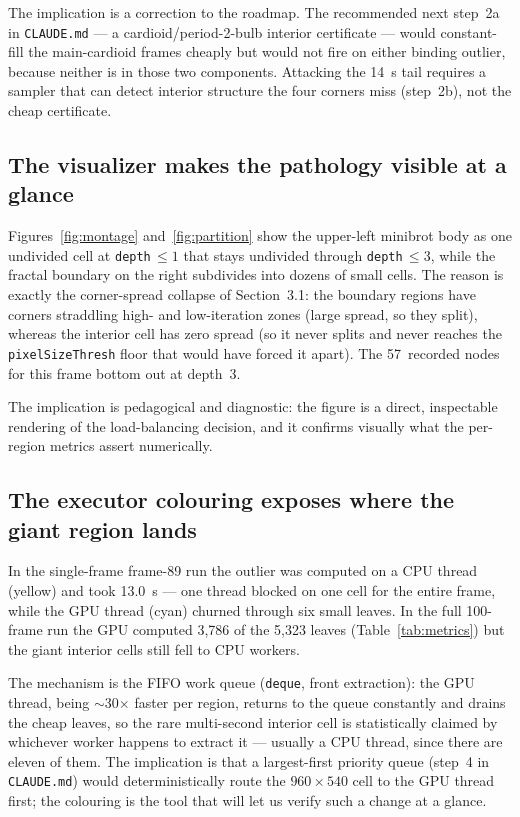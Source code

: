 \documentclass[
	english,
	letterpaper, oneside
]{article}
\begin{document}
The implication is a correction to the roadmap. The recommended next step~2a in
\texttt{CLAUDE.md} --- a cardioid/period-2-bulb interior certificate --- would
constant-fill the main-cardioid frames cheaply but would not fire on
either binding outlier, because neither is in those two components. Attacking
the 14~s tail requires a sampler that can detect interior structure the four
corners miss (step~2b), not the cheap certificate.

\subsection{The visualizer makes the pathology visible at a glance}

Figures~\ref{fig:montage} and~\ref{fig:partition} show the upper-left minibrot
body as one undivided cell at \texttt{depth}\,$\le 1$ that stays undivided
through \texttt{depth}\,$\le 3$, while the fractal boundary on the right
subdivides into dozens of small cells. The reason is exactly the corner-spread
collapse of Section~3.1: the boundary regions have corners straddling
high- and low-iteration zones (large spread, so they split), whereas the
interior cell has zero spread (so it never splits and never reaches the
\texttt{pixelSizeThresh} floor that would have forced it apart). The 57~recorded
nodes for this frame bottom out at depth~3.

The implication is pedagogical and diagnostic: the figure is a direct,
inspectable rendering of the load-balancing decision, and it confirms visually
what the per-region metrics assert numerically.

\subsection{The executor colouring exposes where the giant region lands}

In the single-frame frame-89 run the outlier was computed on a CPU thread
(yellow) and took 13.0~s --- one thread blocked on one cell for the entire
frame, while the GPU thread (cyan) churned through six small leaves. In the
full 100-frame run the GPU computed 3{,}786 of the 5{,}323 leaves
(Table~\ref{tab:metrics}) but the giant interior cells still fell to CPU
workers.

The mechanism is the FIFO work queue (\texttt{deque}, front extraction): the
GPU thread, being $\sim$30$\times$ faster per region, returns to the queue
constantly and drains the cheap leaves, so the rare multi-second interior cell
is statistically claimed by whichever worker happens to extract it --- usually a
CPU thread, since there are eleven of them. The implication is that a
largest-first priority queue (step~4 in \texttt{CLAUDE.md}) would deterministically
route the $960\times540$ cell to the GPU thread first; the colouring is the tool
that will let us verify such a change at a glance.
\end{document}
